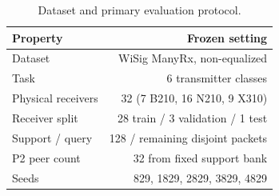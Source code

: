 \begin{table}[t]
\centering
\caption{Dataset and primary evaluation protocol.}
\label{tab:protocol}
\small
\begin{tabular}{lr}
\toprule
Property & Frozen setting\\
\midrule
Dataset & WiSig ManyRx, non-equalized\\
Task & 6 transmitter classes\\
Physical receivers & 32 (7 B210, 16 N210, 9 X310)\\
Receiver split & 28 train / 3 validation / 1 test\\
Support / query & 128 / remaining disjoint packets\\
P2 peer count & 32 from fixed support bank\\
Seeds & 829, 1829, 2829, 3829, 4829\\
\bottomrule
\end{tabular}
\end{table}
